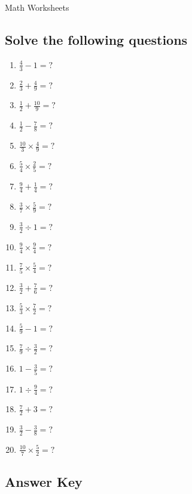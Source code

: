 \documentclass{article}
\begin{document}
\begin{center}
{\Large Math Worksheets}\\
\end{center}

\subsection*{Solve the following questions}

\begin{enumerate}
\item $\displaystyle \frac{4}{3}-1= ? $ \
\item $\displaystyle \frac{2}{3}+\frac{4}{9}= ? $ \
\item $\displaystyle \frac{1}{2}+\frac{10}{9}= ? $ \
\item $\displaystyle \frac{1}{2}-\frac{7}{8}= ? $ \
\item $\displaystyle \frac{10}{3}\times\frac{4}{9}= ? $ \
\item $\displaystyle \frac{5}{4}\times\frac{2}{5}= ? $ \
\item $\displaystyle \frac{9}{4}+\frac{1}{4}= ? $ \
\item $\displaystyle \frac{3}{7}\times\frac{5}{9}= ? $ \
\item $\displaystyle \frac{3}{2}\div1= ? $ \
\item $\displaystyle \frac{9}{4}\times\frac{9}{4}= ? $ \
\item $\displaystyle \frac{7}{5}\times\frac{5}{4}= ? $ \
\item $\displaystyle \frac{3}{2}+\frac{7}{6}= ? $ \
\item $\displaystyle \frac{5}{3}\times\frac{7}{2}= ? $ \
\item $\displaystyle \frac{5}{9}-1= ? $ \
\item $\displaystyle \frac{7}{9}\div\frac{3}{2}= ? $ \
\item $\displaystyle 1-\frac{3}{5}= ? $ \
\item $\displaystyle 1\div\frac{9}{4}= ? $ \
\item $\displaystyle \frac{7}{2}+3= ? $ \
\item $\displaystyle \frac{3}{2}-\frac{3}{8}= ? $ \
\item $\displaystyle \frac{10}{7}\times\frac{5}{2}= ? $ \


\end{enumerate}

\subsection*{Answer Key}
\end{document}

